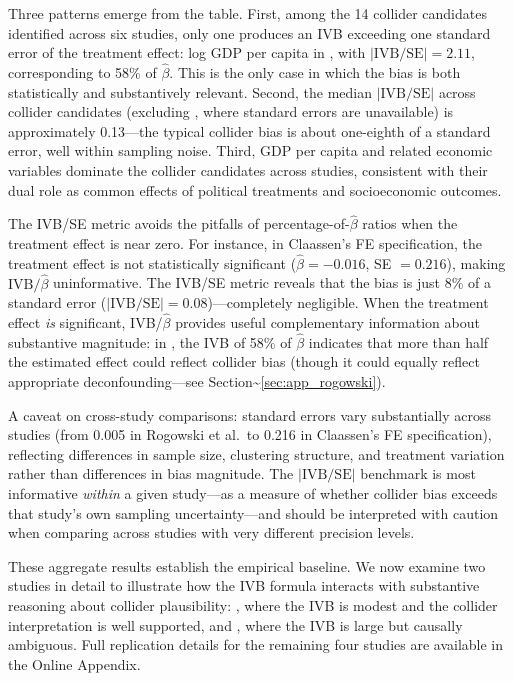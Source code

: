 \documentclass[
]{article}
\begin{document}
Three patterns emerge from the table. First, among the 14 collider
candidates identified across six studies, only one produces an IVB
exceeding one standard error of the treatment effect: log GDP per capita
in \citet{rogowski_etal2022}, with \(|\text{IVB}/\text{SE}| = 2.11\),
corresponding to 58\% of \(\hat\beta\). This is the only case in which
the bias is both statistically and substantively relevant. Second, the
median \(|\text{IVB}/\text{SE}|\) across collider candidates (excluding
\citealt{albers_etal2023}, where standard errors are unavailable) is
approximately 0.13---the typical collider bias is about one-eighth of a
standard error, well within sampling noise. Third, GDP per capita and
related economic variables dominate the collider candidates across
studies, consistent with their dual role as common effects of political
treatments and socioeconomic outcomes.

The IVB/SE metric avoids the pitfalls of percentage-of-\(\hat\beta\)
ratios when the treatment effect is near zero. For instance, in
Claassen's FE specification, the treatment effect is not statistically
significant (\(\hat\beta = -0.016\), SE \(= 0.216\)), making
\(\text{IVB}/\hat\beta\) uninformative. The IVB/SE metric reveals that
the bias is just 8\% of a standard error
(\(|\text{IVB}/\text{SE}| = 0.08\))---completely negligible. When the
treatment effect \textit{is} significant, IVB/\(\hat\beta\) provides
useful complementary information about substantive magnitude: in
\citet{rogowski_etal2022}, the IVB of 58\% of \(\hat\beta\) indicates
that more than half the estimated effect could reflect collider bias
(though it could equally reflect appropriate deconfounding---see
Section\textasciitilde{}\ref{sec:app_rogowski}).

A caveat on cross-study comparisons: standard errors vary substantially
across studies (from 0.005 in Rogowski et al.~to 0.216 in Claassen's FE
specification), reflecting differences in sample size, clustering
structure, and treatment variation rather than differences in bias
magnitude. The \(|\text{IVB}/\text{SE}|\) benchmark is most informative
\textit{within} a given study---as a measure of whether collider bias
exceeds that study's own sampling uncertainty---and should be
interpreted with caution when comparing across studies with very
different precision levels.

These aggregate results establish the empirical baseline. We now examine
two studies in detail to illustrate how the IVB formula interacts with
substantive reasoning about collider plausibility:
\citet{leipziger2024}, where the IVB is modest and the collider
interpretation is well supported, and \citet{rogowski_etal2022}, where
the IVB is large but causally ambiguous. Full replication details for
the remaining four studies are available in the Online Appendix.
\end{document}
